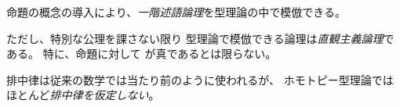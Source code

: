 \documentclass[index]{subfiles}
\begin{document}

命題の概念の導入により、\emph{一階述語論理}を型理論の中で模倣できる。




ただし、特別な公理を課さない限り
型理論で模倣できる論理は\emph{直観主義論理}である。
特に、命題に対して
が真であるとは限らない。



排中律は従来の数学では当たり前のように使われるが、
ホモトピー型理論ではほとんど\emph{排中律を仮定しない}。
\end{document}
